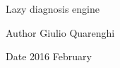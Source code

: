 Lazy diagnosis engine\begin{DoxyAuthor}{Author}
Giulio Quarenghi
\end{DoxyAuthor}
\begin{DoxyDate}{Date}
2016 February 
\end{DoxyDate}

